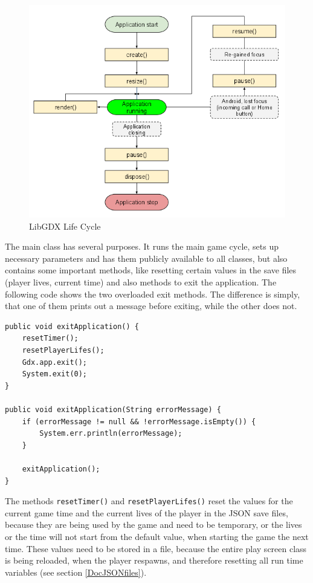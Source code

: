 \documentclass[12p]{article}
\begin{document}
\begin{figure}[ht]
  \center
  \includegraphics[width=1\textwidth]{Documentation/lifeCycle}
  \caption{LibGDX Life Cycle \cite{libGDXLifeCycle}}
  \label{fig:LibGDXLifeCycle}
\end{figure}

The main class has several purposes. It runs the main game cycle, sets up necessary parameters and has them publicly available to all classes, but also contains some important methods, like resetting certain values in the save files (player lives, current time) and also methods to exit the application. The following code shows the two overloaded exit methods. The difference is simply, that one of them prints out a message before exiting, while the other does not.

\begin{verbatim}
public void exitApplication() {
	resetTimer();
	resetPlayerLifes();
	Gdx.app.exit();
	System.exit(0);
}

public void exitApplication(String errorMessage) {
	if (errorMessage != null && !errorMessage.isEmpty()) {
		System.err.println(errorMessage);
	}

	exitApplication();
}
\end{verbatim}

The methods \texttt{resetTimer()} and \texttt{resetPlayerLifes()} reset the values for the current game time and the current lives of the player in the JSON save files, because they are being used by the game and need to be temporary, or the lives or the time will not start from the default value, when starting the game the next time. These values need to be stored in a file, because the entire play screen class is being reloaded, when the player respawns, and therefore resetting all run time variables (see section \ref{DocJSONfiles}).
\end{document}
